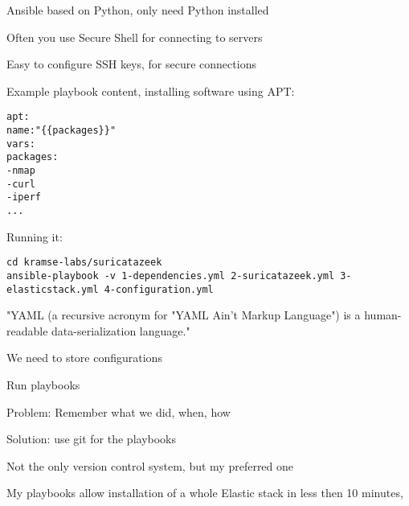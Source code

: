 \documentclass[Screen16to9,17pt]{foils}
\begin{document}


\begin{list2}
\item Ansible based on Python, only need Python installed\\
\item Often you use Secure Shell for connecting to servers\\
\item Easy to configure SSH keys, for secure connections
\end{list2}



Example playbook content, installing software using APT:
\begin{alltt}\small
apt:
    name: "\{\{ packages \}\}"
    vars:
      packages:
        - nmap
        - curl
        - iperf
        ...
\end{alltt}

Running it:
\begin{verbatim}
cd kramse-labs/suricatazeek
ansible-playbook -v 1-dependencies.yml 2-suricatazeek.yml 3-elasticstack.yml 4-configuration.yml
\end{verbatim}

"YAML (a recursive acronym for "YAML Ain't Markup Language") is a human-readable data-serialization language."\\



\begin{list2}
\item We need to store configurations
\item Run playbooks
\item Problem: Remember what we did, when, how
\item Solution: use git for the playbooks
\item Not the only version control system, but my preferred one
\end{list2}



My playbooks allow installation of a whole Elastic stack in less then 10 minutes,
\end{document}
